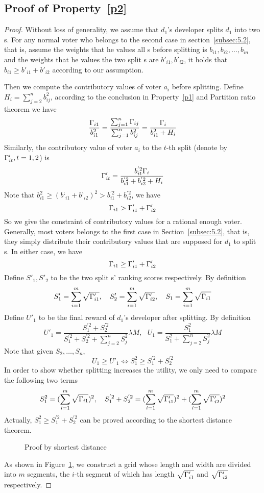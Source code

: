 \subsection{Proof of Property~\ref{p2}}
\label{subsection:proof2}
\begin{proof}
	Without loss of generality, we assume that $d_1$'s developer splits $d_1$
	into two {\dapp}s. For any normal voter who belongs to the second case in
	section~\ref{subsec:5.2}, that is, assume the weights that he values all
	{\dapp}s before splitting is $b_{i1},b_{i2},\ldots,b_{in}$ and the weights that he values the two split {\dapp}s are $b'_{i1},b'_{i2}$, it holds that $b_{i1} \geq b'_{i1}+b'_{i2}$ according to our assumption.

	Then we compute the contributory values of voter $a_i$ before splitting. Define $H_i = \sum_{j=2}^n b_{ij}^2$, according to the conclusion in Property~\ref{p1} and Partition ratio theorem we have
		 $$\frac{\Gamma_{i1}}{b_{i1}^2} = \frac{\sum_{j=1}^n \Gamma_{ij}}{\sum_{j=1}^n b_{ij}^2} = \frac{\Gamma_i}{b_{i1}^2+H_i}$$
  Similarly, the contributory value of voter $a_i$ to the $t$-th split \dapp (denote by $\Gamma'_{it},t=1,2$) is
  	 $$\Gamma'_{it} =  \frac{b_{it}^{'2}\Gamma_i}{b_{i1}^{'2}+b_{i2}^{'2}+H_i}$$
  	 Note that $b_{i1}^2 \geq (b‘_{i1}+b’_{i2})^2 >b_{i1}^{'2}+b_{i2}^{'2}$, we have
  	 $$\Gamma_{i1} > \Gamma'_{i1}+\Gamma'_{i2}$$
  	 So we give the constraint of contributory values for a rational enough voter. Generally, most voters belongs to the first case in Section~\ref{subsec:5.2}, that is, they simply distribute their contributory values that are supposed for $d_1$ to split {\dapp}s. In either case, we have
  	 	 	$$\Gamma_{i1} \geq \Gamma'_{i1}+\Gamma'_{i2}$$
  	 Define $S'_1,S'_2$ to be the two split {\dapp}s' ranking scores respectively. By definition
  	 	 $$S'_1 =  \sum_{i=1}^m \sqrt{\Gamma'_{i1}},~~~S'_2 =  \sum_{i=1}^m \sqrt{\Gamma'_{i2}},~~~S_1 = \sum_{i=1}^m \sqrt{\Gamma_{i1}}$$
  	Define $U'_1$ to be the final reward of $d_1$'s developer after splitting. By definition
  		 $$U'_1=\frac{S_1^{'2}+S_2^{'2}}{S_1^{'2}+S_2^{'2}+\sum_{j=2}^n S_j^2} \lambda M,~~~U_1=\frac{S^2_1}{S_1^2+\sum_{j=2}^n S_j^2} \lambda M$$
  	Note that given $S_2,\ldots,S_n$,
  		 $$ U_1 \geq U'_1 \Leftrightarrow S_1^2 \geq S_1^{'2}+S_2^{'2}$$
   In order to show whether splitting increases the utility, we only need to compare the following two terms
   	 $$S_1^2 = (\sum_{i=1}^m \sqrt{\Gamma_{i1}})^2,~~~S_1^{'2}+S_2^{'2}=  (\sum_{i=1}^m \sqrt{\Gamma'_{i1}})^2+(\sum_{i=1}^m \sqrt{\Gamma'_{i2}})^2$$
   	Actually, $S_1^2 \geq S_1^{'2}+S_2^{'2}$ can be proved according to the shortest distance theorem.
   		 \begin{figure}
   		 	\centering
   		 	
   		 	\caption{Proof by shortest distance\label{fig:path}}
   		 \end{figure}
   As shown in Figure~\ref{fig:path}, we construct a grid whose length and width are divided into $m$ segments,  the $i$-th segment of which has length $\sqrt{\Gamma'_{i1}}$ and $\sqrt{\Gamma'_{i2}}$ respectively.


\end{proof}
